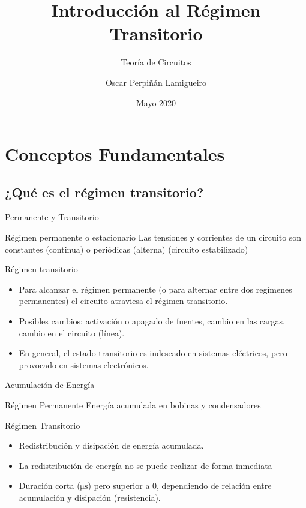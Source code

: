 \documentclass[xcolor={usenames,svgnames,dvipsnames}]{beamer}
\author{Oscar Perpiñán Lamigueiro}
\date{Mayo 2020}
\title{Introducción al Régimen Transitorio}
\subtitle{Teoría de Circuitos}
\begin{document}
\maketitle

\section{Conceptos Fundamentales}
\label{sec:orgf1a59fe}

\subsection{¿Qué es el régimen transitorio?}
\label{sec:orge3e1a34}
\begin{frame}[label={sec:org79cc01c}]{Permanente y Transitorio}
\begin{block}{Régimen permanente o estacionario}
Las tensiones y corrientes de un circuito son constantes (continua) o periódicas (alterna) (circuito estabilizado)
\end{block}
\begin{block}{Régimen transitorio}
\begin{itemize}
\item Para alcanzar el régimen permanente (o para alternar entre dos regímenes permanentes) el circuito atraviesa el régimen transitorio.
\item Posibles cambios: activación o apagado de fuentes, cambio en las cargas, cambio en el circuito (línea).
\item En general, el estado transitorio es indeseado en sistemas eléctricos, pero provocado en sistemas electrónicos.
\end{itemize}
\end{block}
\end{frame}

\begin{frame}[label={sec:org5852a46}]{Acumulación de Energía}
\begin{block}{Régimen Permanente}
\alert{Energía acumulada} en \alert{bobinas} y \alert{condensadores}
\end{block}
\begin{block}{Régimen Transitorio}
\begin{itemize}
\item \alert{Redistribución} y \alert{disipación} de energía acumulada.
\item La redistribución de energía \alert{no} se puede realizar de forma \alert{inmediata}
\item \alert{Duración corta} (\(\si{\micro\second}\)) pero superior a 0, dependiendo de \alert{relación entre acumulación y disipación} (resistencia).
\end{itemize}
\end{block}
\end{frame}
\end{document}
